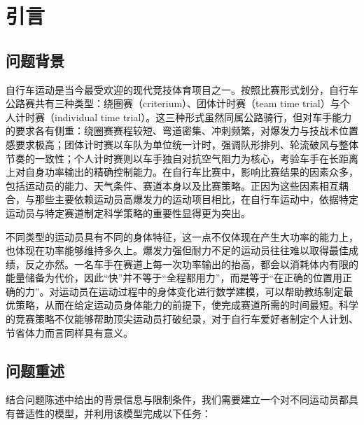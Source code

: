 \documentclass[11pt,a4paper]{ctexart}
\begin{document}
\newpage
\pagestyle{fancy}

\section{引言}

\subsection{问题背景}

自行车运动是当今最受欢迎的现代竞技体育项目之一。按照比赛形式划分，自行车公路赛共有三种类型：绕圈赛（criterium）、团体计时赛（team time trial）与个人计时赛（individual time trial）。这三种形式虽然同属公路骑行，但对车手能力的要求各有侧重：绕圈赛赛程较短、弯道密集、冲刺频繁，对爆发力与技战术位置感要求极高；团体计时赛以车队为单位统一计时，强调队形排列、轮流破风与整体节奏的一致性；个人计时赛则以车手独自对抗空气阻力为核心，考验车手在长距离上对自身功率输出的精确控制能力。在自行车比赛中，影响比赛结果的因素众多，包括运动员的能力、天气条件、赛道本身以及比赛策略。正因为这些因素相互耦合，与那些主要依赖运动员高爆发力的运动项目相比，在自行车运动中，依据特定运动员与特定赛道制定科学策略的重要性显得更为突出。

不同类型的运动员具有不同的身体特征，这一点不仅体现在产生大功率的能力上，也体现在功率能够维持多久上。爆发力强但耐力不足的运动员往往难以取得最佳成绩，反之亦然。一名车手在赛道上每一次功率输出的抬高，都会以消耗体内有限的能量储备为代价，因此“快”并不等于“全程都用力”，而是等于“在正确的位置用正确的力”。对运动员在运动过程中的身体变化进行数学建模，可以帮助教练制定最优策略，从而在给定运动员身体能力的前提下，使完成赛道所需的时间最短。科学的竞赛策略不仅能够帮助顶尖运动员打破纪录，对于自行车爱好者制定个人计划、节省体力而言同样具有意义。

\subsection{问题重述}

结合问题陈述中给出的背景信息与限制条件，我们需要建立一个对不同运动员都具有普适性的模型，并利用该模型完成以下任务：
\end{document}
